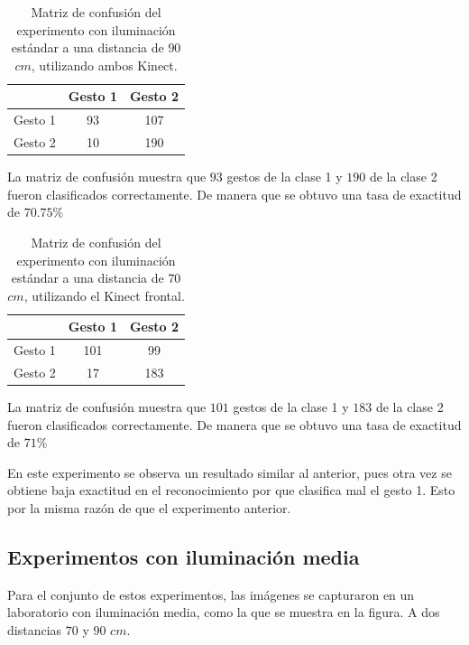\begin{itemize}
\begin{table}[h!] 
\begin{center}
\begin{tabular}{ r || c | c |} 
        & Gesto 1 & Gesto 2 \\ \hline \hline  
Gesto 1 &  93    & 107      \\ \hline  
Gesto 2 &  10    & 190     \\   
\end{tabular}
\end{center} 
\caption{Matriz de confusión del experimento con iluminación estándar a una distancia de $90$ $cm$, utilizando ambos Kinect.}
\label{table:90LK2}
\end{table} 

La matriz de confusión muestra que $93$ gestos de la clase 1 y $190$ de la clase 2 fueron clasificados correctamente. De manera que se obtuvo una tasa de exactitud de $70.75\%$ 

\begin{table}[h!] 
\begin{center}
\begin{tabular}{ r || c | c |} 
        & Gesto 1 & Gesto 2 \\ \hline \hline  
Gesto 1 &  101   & 99      \\ \hline  
Gesto 2 &  17    & 183     \\   
\end{tabular}
\end{center} 
\caption{Matriz de confusión del experimento con iluminación estándar a una distancia de $70$ $cm$, utilizando el Kinect frontal.}
\label{table:90LK1}
\end{table} 

La matriz de confusión muestra que $101$ gestos de la clase 1 y $183$ de la clase 2 fueron clasificados correctamente. De manera que se obtuvo una tasa de exactitud de $71 \%$  

\end{itemize}

En este experimento se observa un resultado similar al anterior, pues otra vez se obtiene baja exactitud en el reconocimiento por que clasifica mal el gesto 1. Esto por la misma razón de que el experimento anterior.



\subsection{Experimentos con iluminación media} 
Para el conjunto de estos experimentos, las imágenes se capturaron en un laboratorio con iluminación media, como la que se muestra en la figura. A dos distancias $70$ y $90$ $cm$.  

